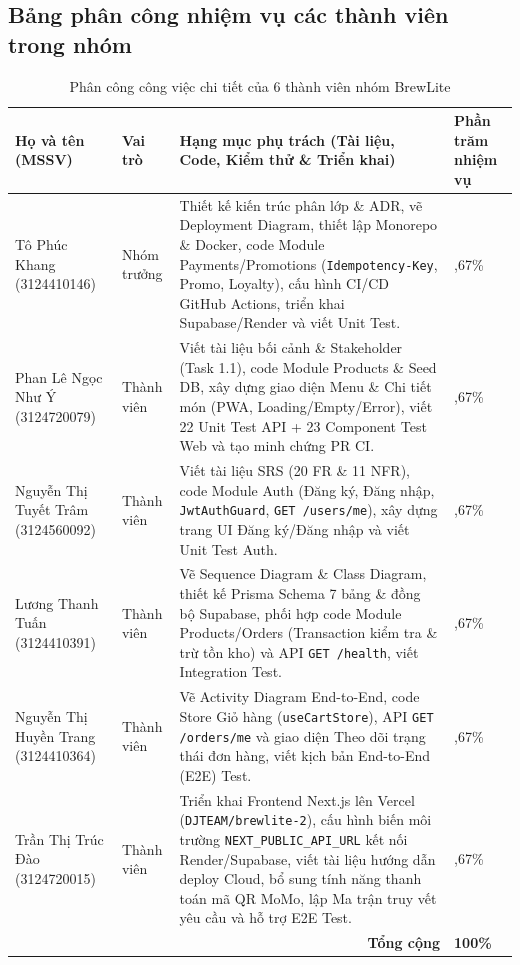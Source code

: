 \subsection{Bảng phân công nhiệm vụ các thành viên trong nhóm}
\begin{table}[H]
\centering
\small
\renewcommand{\arraystretch}{1.25}
\caption{Phân công công việc chi tiết của 6 thành viên nhóm BrewLite}
\begin{tabularx}{\textwidth}{|p{}|p{}|X|>{\centering\arraybackslash}p{}|}
\hline
\textbf{Họ và tên (MSSV)} & \textbf{Vai trò} & \textbf{Hạng mục phụ trách (Tài liệu, Code, Kiểm thử \& Triển khai)} & \textbf{Phần trăm nhiệm vụ} \\
\hline
Tô Phúc Khang \newline (3124410146) & Nhóm trưởng & Thiết kế kiến trúc phân lớp \& ADR, vẽ Deployment Diagram, thiết lập Monorepo \& Docker, code Module Payments/Promotions (\texttt{Idempotency-Key}, Promo, Loyalty), cấu hình CI/CD GitHub Actions, triển khai Supabase/Render và viết Unit Test. & 16,67\% \\
\hline
Phan Lê Ngọc Như Ý \newline (3124720079) & Thành viên & Viết tài liệu bối cảnh \& Stakeholder (Task 1.1), code Module Products \& Seed DB, xây dựng giao diện Menu \& Chi tiết món (PWA, Loading/Empty/Error), viết 22 Unit Test API + 23 Component Test Web và tạo minh chứng PR CI. & 16,67\% \\
\hline
Nguyễn Thị Tuyết Trâm \newline (3124560092) & Thành viên & Viết tài liệu SRS (20 FR \& 11 NFR), code Module Auth (Đăng ký, Đăng nhập, \texttt{JwtAuthGuard}, \texttt{GET /users/me}), xây dựng trang UI Đăng ký/Đăng nhập và viết Unit Test Auth. & 16,67\% \\
\hline
Lương Thanh Tuấn \newline (3124410391) & Thành viên & Vẽ Sequence Diagram \& Class Diagram, thiết kế Prisma Schema 7 bảng \& đồng bộ Supabase, phối hợp code Module Products/Orders (Transaction kiểm tra \& trừ tồn kho) và API \texttt{GET /health}, viết Integration Test. & 16,67\% \\
\hline
Nguyễn Thị Huyền Trang \newline (3124410364) & Thành viên & Vẽ Activity Diagram End-to-End, code Store Giỏ hàng (\texttt{useCartStore}), API \texttt{GET /orders/me} và giao diện Theo dõi trạng thái đơn hàng, viết kịch bản End-to-End (E2E) Test. & 16,67\% \\
\hline
Trần Thị Trúc Đào \newline (3124720015) & Thành viên & Triển khai Frontend Next.js lên Vercel (\texttt{DJTEAM/brewlite-2}), cấu hình biến môi trường \texttt{NEXT\_PUBLIC\_API\_URL} kết nối Render/Supabase, viết tài liệu hướng dẫn deploy Cloud, bổ sung tính năng thanh toán mã QR MoMo, lập Ma trận truy vết yêu cầu và hỗ trợ E2E Test. & 16,67\% \\
\hline
\multicolumn{3}{|r|}{\textbf{Tổng cộng}} & \textbf{100\%} \\
\hline
\end{tabularx}
\end{table}